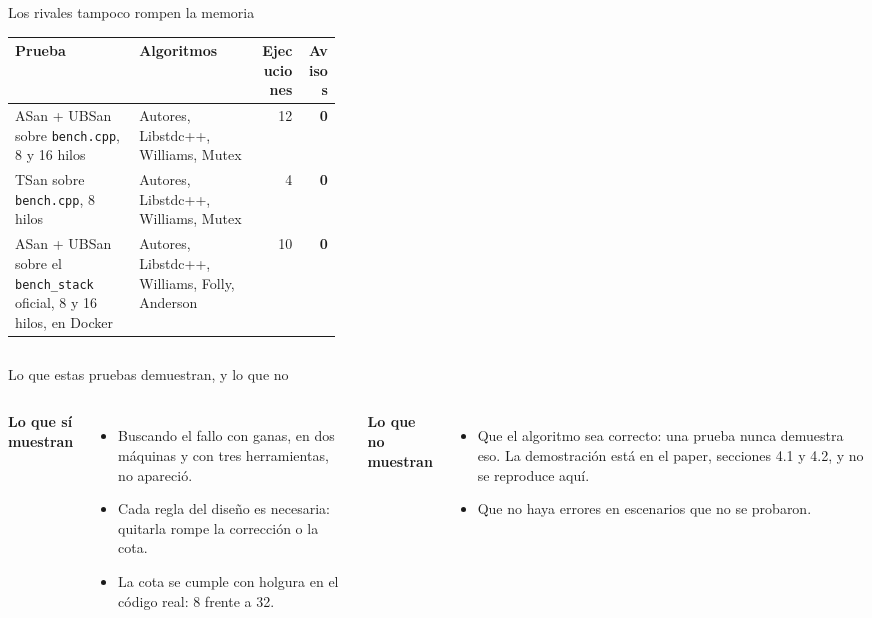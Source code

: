 \begin{frame}{Los rivales tampoco rompen la memoria}
  \footnotesize\renewcommand{\arraystretch}{1.15}
  \begin{tabularx}{\linewidth}{@{}p{0.38\linewidth}Xrr@{}}
    \toprule
    \textbf{Prueba} & \textbf{Algoritmos} & \textbf{Ejecuciones} & \textbf{Avisos}\\
    \midrule
    ASan + UBSan sobre \texttt{bench.cpp}, 8 y 16 hilos & Autores, Libstdc++, Williams, Mutex & 12 & \textbf{0}\\
    TSan sobre \texttt{bench.cpp}, 8 hilos & Autores, Libstdc++, Williams, Mutex & 4 & \textbf{0}\\
    ASan + UBSan sobre el \texttt{bench\_stack} oficial, 8 y 16 hilos, en Docker & Autores, Libstdc++, Williams, Folly, Anderson & 10 & \textbf{0}\\
    \bottomrule
  \end{tabularx}
  \vfill
  \begin{columns}[T]
  \end{columns}
\end{frame}

\begin{frame}{Lo que estas pruebas demuestran, y lo que no}
  \begin{columns}[T]
    {\color{verde}\bfseries Lo que sí muestran}\par\smallskip
    \begin{itemize}\small
      \item Buscando el fallo con ganas, en dos máquinas y con tres herramientas, no apareció.
      \item Cada regla del diseño es necesaria: quitarla rompe la corrección o la cota.
      \item La cota se cumple con holgura en el código real: 8 frente a 32.
    \end{itemize}
    {\color{rojo}\bfseries Lo que no muestran}\par\smallskip
    \begin{itemize}\small
      \item Que el algoritmo sea correcto: una prueba nunca demuestra eso. La demostración está en el paper, secciones 4.1 y 4.2, y no se reproduce aquí.
      \item Que no haya errores en escenarios que no se probaron.
    \end{itemize}
  \end{columns}
  \vfill
\end{frame}
